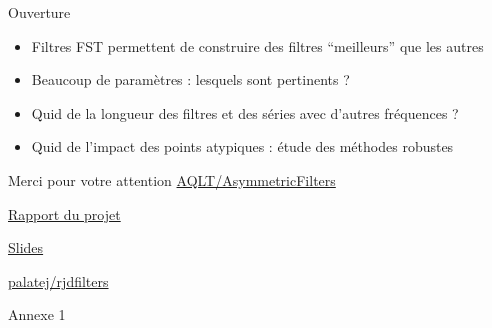 \documentclass[10pt,xcolor=table,color={dvipsnames,usenames},ignorenonframetext,usepdftitle=false,french]{beamer}
\providecommand{\tightlist}{%
  \setlength{\parskip}{0pt}
  }
\newcommand\1{\mathds{1}}
\begin{document}
\begin{frame}{Ouverture}
\protect\hypertarget{ouverture}{}
\begin{itemize}
\tightlist
\item
  Filtres FST permettent de construire des filtres ``meilleurs'' que les
  autres
\end{itemize}

\bigskip \pause

\begin{itemize}
\tightlist
\item
  Beaucoup de paramètres : lesquels sont pertinents ?
\end{itemize}

\bigskip \pause

\begin{itemize}
\tightlist
\item
  Quid de la longueur des filtres et des séries avec d'autres fréquences
  ?
\end{itemize}

\bigskip \pause

\begin{itemize}
\tightlist
\item
  Quid de l'impact des points atypiques : étude des méthodes robustes
\end{itemize}
\end{frame}

\begin{frame}[noframenumbering]{Merci pour votre attention}
\protect\hypertarget{merci-pour-votre-attention}{}
\href{https://github.com/AQLT/AsymmetricFilters}{\faGithub{} AQLT/AsymmetricFilters}

\href{https://aqlt.github.io/AsymmetricFilters/Rapport\%20de\%20stage/Rapport.pdf}{\faEdit{} Rapport du projet}

\href{https://aqlt.github.io/AsymmetricFilters/Rapport\%20de\%20stage/Rapport.pdf}{\faFilePowerpoint{} Slides}

\href{https://github.com/palatej/rjdfilters}{\faRProject \faCube{} palatej/rjdfilters}
\end{frame}

\begin{frame}[noframenumbering]{Annexe 1}
\protect\hypertarget{annexe-1}{}
\end{frame}
\end{document}
